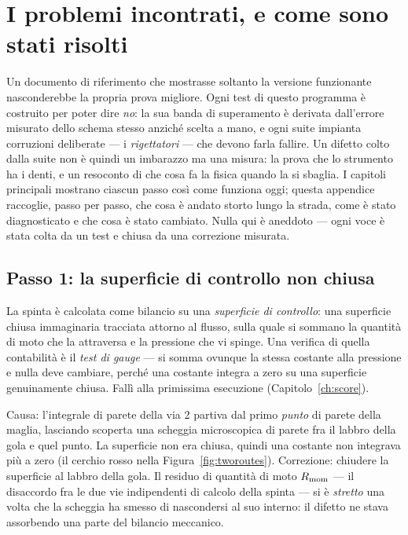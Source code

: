 \chapter{I problemi incontrati, e come sono stati risolti}
\label{ch:appendix}

Un documento di riferimento che mostrasse soltanto la versione
funzionante nasconderebbe la propria prova migliore. Ogni test di
questo programma è costruito per poter dire \emph{no}: la sua banda
di superamento è derivata dall'errore misurato dello schema stesso
anziché scelta a mano, e ogni suite impianta corruzioni deliberate
--- i \emph{rigettatori} --- che devono farla fallire. Un difetto
colto dalla suite non è quindi un imbarazzo ma una misura: la prova
che lo strumento ha i denti, e un resoconto di che cosa fa la fisica
quando la si sbaglia. I capitoli principali mostrano ciascun passo
così come funziona oggi; questa appendice raccoglie, passo per passo,
che cosa è andato storto lungo la strada, come è stato diagnosticato
e che cosa è stato cambiato. Nulla qui è aneddoto --- ogni voce è
stata colta da un test e chiusa da una correzione misurata.

\section{Passo 1: la superficie di controllo non chiusa}
\label{app:sliver}

La spinta è calcolata come bilancio su una \emph{superficie di
controllo}: una superficie chiusa immaginaria tracciata attorno al
flusso, sulla quale si sommano la quantità di moto che la attraversa
e la pressione che vi spinge. Una verifica di quella contabilità è il
\emph{test di gauge} --- si somma ovunque la stessa costante alla
pressione e nulla deve cambiare, perché una costante integra a zero
su una superficie genuinamente chiusa. Fallì alla primissima
esecuzione (Capitolo~\ref{ch:score}).

Causa: l'integrale di parete della via 2 partiva dal primo
\emph{punto} di parete della maglia, lasciando scoperta una scheggia
microscopica di parete fra il labbro della gola e quel punto. La
superficie non era chiusa, quindi una costante non integrava più a
zero (il cerchio rosso nella Figura~\ref{fig:tworoutes}). Correzione:
chiudere la superficie al labbro della gola. Il residuo di quantità
di moto $R_{\rm mom}$ --- il disaccordo fra le due vie indipendenti
di calcolo della spinta --- si è \emph{stretto} una volta che la
scheggia ha smesso di nascondersi al suo interno: il difetto ne stava
assorbendo una parte del bilancio meccanico.

